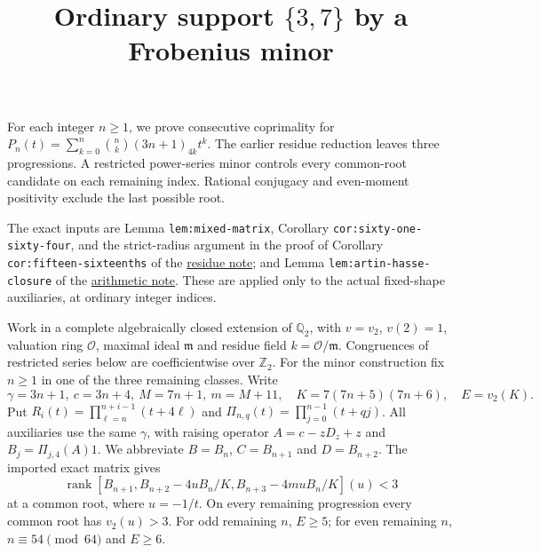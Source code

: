 \documentclass[11pt]{article}
\begin{document}
\title{Ordinary support $\{3,7\}$ by a Frobenius minor}
\author{}\date{}\maketitle
For each integer $n\ge1$, we prove consecutive coprimality for
$P_n(t)=\sum_{k=0}^n\binom nk(3n+1)_{4k}t^k$.
The earlier residue reduction leaves three progressions.
A restricted power-series minor controls every common-root candidate
on each remaining index. Rational conjugacy and even-moment
positivity exclude the last possible root.

The exact inputs are Lemma \texttt{lem:mixed-matrix},
Corollary \texttt{cor:sixty-one-sixty-four}, and the strict-radius
argument in the proof of Corollary \texttt{cor:fifteen-sixteenths}
of the \href{LOWER_THREE_FOURTH_POWER_RESIDUE_REDUCTION.tex}{residue note};
and Lemma \texttt{lem:artin-hasse-closure} of the
\href{ARITHMETIC_FRONTIER_TERMINAL_ORDERS.tex}{arithmetic note}.
These are applied only to the actual fixed-shape auxiliaries,
at ordinary integer indices.

Work in a complete algebraically closed extension of $\mathbb Q_2$,
with $v=v_2$, $v(2)=1$, valuation ring $\mathcal O$, maximal ideal
$\mathfrak m$ and residue field $k=\mathcal O/\mathfrak m$. Congruences of restricted series below are
coefficientwise over $\mathbb Z_2$.
For the minor construction fix $n\ge1$ in one of the three remaining classes.
Write
\[
 \gamma=3n+1,\ c=3n+4,\ M=7n+1,\ m=M+11,\quad
 K=7(7n+5)(7n+6),\quad E=v_2(K).
\]
Put $R_i(t)=\prod_{\ell=n}^{n+i-1}(t+4\ell)$ and
$\Pi_{n,q}(t)=\prod_{j=0}^{n-1}(t+qj)$.
All auxiliaries use the same $\gamma$, with raising operator
$A=c-zD_z+z$ and $B_j=\Pi_{j,4}(A)1$.
We abbreviate $B=B_n$, $C=B_{n+1}$ and $D=B_{n+2}$.
The imported exact matrix gives
\[
 \operatorname{rank}[B_{n+1},B_{n+2}-4uB_n/K,
              B_{n+3}-4muB_n/K](u)<3                 \tag{1}
\]
at a common root, where $u=-1/t$.
On every remaining progression every common root has $v_2(u)>3$.
For odd remaining $n$, $E\ge5$; for even remaining $n$,
$n\equiv54\pmod{64}$ and $E\ge6$.
\end{document}
